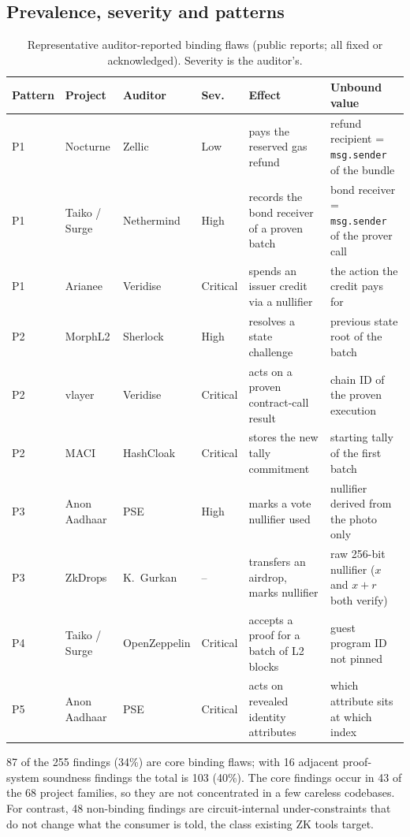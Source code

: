 \subsection{Prevalence, severity and patterns}\label{sec:study-prev}

\begin{table}[t]
\centering
\caption{Representative auditor-reported binding flaws (public reports; all
fixed or acknowledged). Severity is the auditor's.}
\label{tab:examples}
\footnotesize
\begin{tabular}{@{}llllp{4.3cm}p{4.6cm}@{}}
\toprule
\textbf{Pattern} & \textbf{Project} & \textbf{Auditor} & \textbf{Sev.} & \textbf{Effect} & \textbf{Unbound value} \\
\midrule
P1 & Nocturne & Zellic & Low & pays the reserved gas refund & refund recipient = \texttt{msg.sender} of the bundle \\
P1 & Taiko / Surge & Nethermind & High & records the bond receiver of a proven batch & bond receiver = \texttt{msg.sender} of the prover call \\
P1 & Arianee & Veridise & Critical & spends an issuer credit via a nullifier & the action the credit pays for \\
P2 & MorphL2 & Sherlock & High & resolves a state challenge & previous state root of the batch \\
P2 & vlayer & Veridise & Critical & acts on a proven contract-call result & chain ID of the proven execution \\
P2 & MACI & HashCloak & Critical & stores the new tally commitment & starting tally of the first batch \\
P3 & Anon Aadhaar & PSE & High & marks a vote nullifier used & nullifier derived from the photo only \\
P3 & ZkDrops & K.\ Gurkan & -- & transfers an airdrop, marks nullifier & raw 256-bit nullifier ($x$ and $x{+}r$ both verify) \\
P4 & Taiko / Surge & OpenZeppelin & Critical & accepts a proof for a batch of L2 blocks & guest program ID not pinned \\
P5 & Anon Aadhaar & PSE & Critical & acts on revealed identity attributes & which attribute sits at which index \\
\bottomrule
\end{tabular}
\end{table}


87 of the 255 findings (34\%) are core binding flaws; with 16 adjacent
proof-system soundness findings the total is 103 (40\%). The core findings
occur in 43 of the 68 project families, so they are not concentrated in a few
careless codebases. For contrast, 48 non-binding findings are
circuit-internal under-constraints that do not change what the consumer is
told, the class existing ZK tools target.

